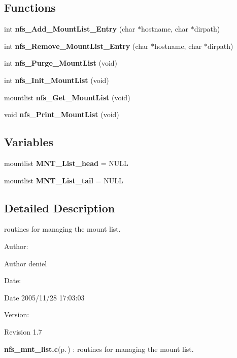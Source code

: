 \subsection*{Functions}
\begin{CompactItemize}
\item 
int {\bf nfs\_\-Add\_\-Mount\-List\_\-Entry} (char $\ast$hostname, char $\ast$dirpath)
\item 
int {\bf nfs\_\-Remove\_\-Mount\-List\_\-Entry} (char $\ast$hostname, char $\ast$dirpath)
\item 
int {\bf nfs\_\-Purge\_\-Mount\-List} (void)
\item 
int {\bf nfs\_\-Init\_\-Mount\-List} (void)
\item 
mountlist {\bf nfs\_\-Get\_\-Mount\-List} (void)
\item 
void {\bf nfs\_\-Print\_\-Mount\-List} (void)
\end{CompactItemize}
\subsection*{Variables}
\begin{CompactItemize}
\item 
mountlist {\bf MNT\_\-List\_\-head} = NULL
\item 
mountlist {\bf MNT\_\-List\_\-tail} = NULL
\end{CompactItemize}


\subsection{Detailed Description}
routines for managing the mount list. 

\begin{Desc}
\item[Author:]\begin{Desc}
\item[Author]deniel \end{Desc}
\end{Desc}
\begin{Desc}
\item[Date:]\begin{Desc}
\item[Date]2005/11/28 17:03:03 \end{Desc}
\end{Desc}
\begin{Desc}
\item[Version:]\begin{Desc}
\item[Revision]1.7 \end{Desc}
\end{Desc}
{\bf nfs\_\-mnt\_\-list.c}{\rm (p.\,\pageref{nfs__mnt__list_8c})} : routines for managing the mount list.

